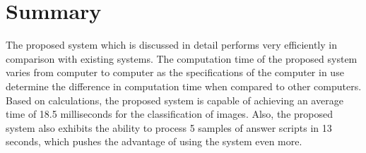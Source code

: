 \section{Summary}


\noindent
The proposed system which is discussed in detail performs very efficiently in comparison with existing systems. The computation time of the proposed system varies from computer to computer as the specifications of the computer in use determine the difference in computation time when compared to other computers. Based on calculations, the proposed system is capable of achieving an average time of 18.5 milliseconds for the classification of images. Also, the proposed system also exhibits the ability to process 5 samples of answer scripts in 13 seconds, which pushes the advantage of using the system even more.